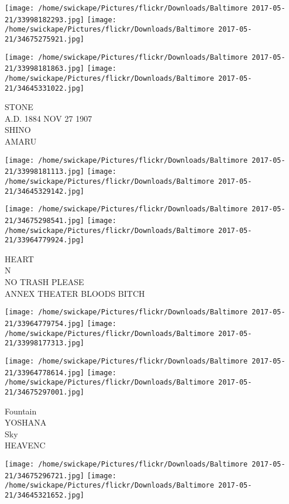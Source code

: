 \documentclass[10pt,letterpaper]{article}
\begin{document}
\texttt{[image: /home/swickape/Pictures/flickr/Downloads/Baltimore 2017-05-21/33998182293.jpg]}
\texttt{[image: /home/swickape/Pictures/flickr/Downloads/Baltimore 2017-05-21/34675275921.jpg]}

\texttt{[image: /home/swickape/Pictures/flickr/Downloads/Baltimore 2017-05-21/33998181863.jpg]}
\texttt{[image: /home/swickape/Pictures/flickr/Downloads/Baltimore 2017-05-21/34645331022.jpg]}

STONE\\
A.D. 1884 NOV 27 1907\\
SHINO\\
AMARU\\
\pagebreak

\texttt{[image: /home/swickape/Pictures/flickr/Downloads/Baltimore 2017-05-21/33998181113.jpg]}
\texttt{[image: /home/swickape/Pictures/flickr/Downloads/Baltimore 2017-05-21/34645329142.jpg]}

\texttt{[image: /home/swickape/Pictures/flickr/Downloads/Baltimore 2017-05-21/34675298541.jpg]}
\texttt{[image: /home/swickape/Pictures/flickr/Downloads/Baltimore 2017-05-21/33964779924.jpg]}

HEART\\
N\\
NO TRASH PLEASE\\
ANNEX THEATER BLOODS BITCH\\
\pagebreak

\texttt{[image: /home/swickape/Pictures/flickr/Downloads/Baltimore 2017-05-21/33964779754.jpg]}
\texttt{[image: /home/swickape/Pictures/flickr/Downloads/Baltimore 2017-05-21/33998177313.jpg]}

\texttt{[image: /home/swickape/Pictures/flickr/Downloads/Baltimore 2017-05-21/33964778614.jpg]}
\texttt{[image: /home/swickape/Pictures/flickr/Downloads/Baltimore 2017-05-21/34675297001.jpg]}

Fountain\\
YOSHANA\\
Sky\\
HEAVENC\\
\pagebreak

\texttt{[image: /home/swickape/Pictures/flickr/Downloads/Baltimore 2017-05-21/34675296721.jpg]}
\texttt{[image: /home/swickape/Pictures/flickr/Downloads/Baltimore 2017-05-21/34645321652.jpg]}
\end{document}

